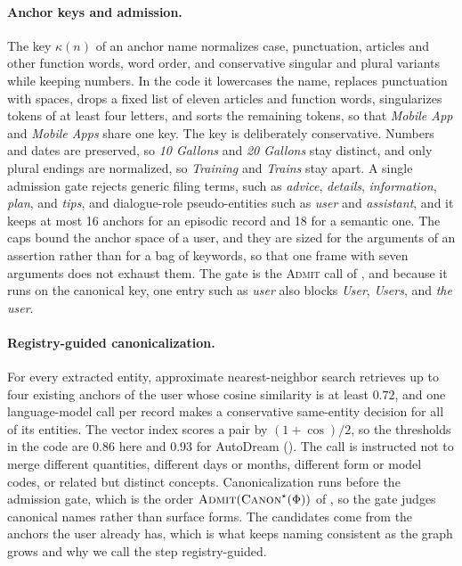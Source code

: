 \paragraph{Anchor keys and admission.}
The key \(\kappa(n)\) of an anchor name normalizes case, punctuation, articles
and other function words, word order, and conservative singular and plural
variants while keeping numbers. In the code it lowercases the name, replaces
punctuation with spaces, drops a fixed list of eleven articles and function
words, singularizes tokens of at least four letters, and sorts the remaining
tokens, so that \emph{Mobile App} and \emph{Mobile Apps} share one key. The key
is deliberately conservative. Numbers and dates are preserved, so \emph{10 Gallons} and \emph{20 Gallons}
stay distinct, and only plural endings are normalized, so \emph{Training} and
\emph{Trains} stay apart. A
single admission gate rejects generic filing terms, such as \emph{advice},
\emph{details}, \emph{information}, \emph{plan}, and \emph{tips}, and
dialogue-role pseudo-entities such as \emph{user} and \emph{assistant}, and it
keeps at most 16 anchors for an episodic record and 18 for a semantic one. The
caps bound the anchor space of a user, and they are sized for the arguments of
an assertion rather than for a bag of keywords, so that one frame with seven
arguments does not exhaust them. The gate is the \textsc{Admit} call of
, and because it runs on the canonical key, one entry such as
\emph{user} also blocks \emph{User}, \emph{Users}, and \emph{the user}.

\paragraph{Registry-guided canonicalization.}
For every extracted entity, approximate nearest-neighbor search retrieves up to four existing anchors of the user whose cosine
similarity is at least \(0.72\), and one language-model call per record makes a
conservative same-entity decision for all of its entities. The vector index
scores a pair by \((1+\cos)/2\), so the thresholds in the code are 0.86 here
and 0.93 for AutoDream (). The call is instructed
not to merge different quantities, different days or months, different form or
model codes, or related but distinct concepts. Canonicalization runs before the admission gate, which is the order \(\textsc{Admit}(\textsc{Canon}^\star(\Phi))\) of
, so the gate judges canonical names rather than surface forms.
The candidates come from the anchors the user already has, which is what keeps
naming consistent as the graph grows and why we call the step registry-guided.

